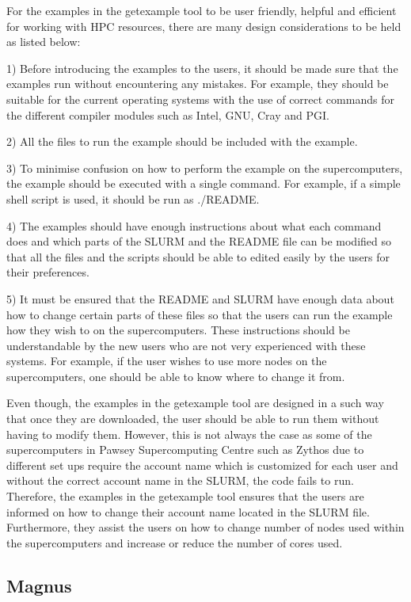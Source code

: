 \documentclass[journal]{IEEEtran}
\begin{document}
For the examples in the getexample tool to be user friendly, helpful and efficient for working with HPC resources, there are many design considerations 
to be held as listed below:

1) Before introducing the examples to the users, it should be made sure that the examples run  without encountering any mistakes. For example,
they should be suitable for the current operating systems with the use of correct commands for the different compiler modules such as Intel, GNU, Cray
and PGI. 

2) All the files to run the example should be included with the example.

3) To minimise confusion on how to perform the example on the supercomputers, the example should be executed with a single command. For example, 
if a simple shell script is used, it should be run as ./README.

4) The examples should have enough instructions about what each command does and which parts of the SLURM and the README file can be modified so that
all the files and the scripts should be able to edited easily by the users for their preferences.

5) It must be ensured that the README and SLURM have enough data about how to change certain parts of these files so that the users can run the 
example how they wish to on the supercomputers. These instructions should be understandable by the new users who are not very experienced with these
systems. For example, if the user wishes to use more nodes on the supercomputers, one should be able to know where to change it from.
 
Even though, the examples in the getexample tool are designed in a such way that once they are downloaded, the user should be able to run them without
having to modify them. However, this is not always the case as some of the supercomputers in Pawsey Supercomputing Centre such as Zythos due to
different set ups require the account name which is customized for each user and without the correct account name in the SLURM, the code fails to run. 
Therefore, the examples in the getexample tool ensures that the users are informed on how to change their account name located in the SLURM file.
Furthermore, they assist the users on how to change number of nodes used within the supercomputers and increase or reduce the number of cores used.     


\subsection{Magnus}
\end{document}
